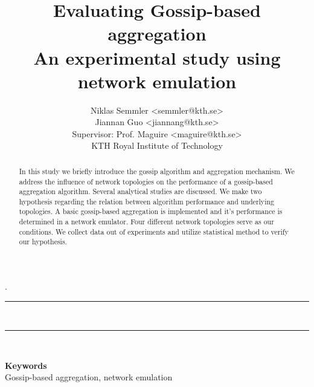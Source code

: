 \documentclass[11pt,a4paper]{article}
\date{}
\title{Evaluating Gossip-based aggregation\\{\large An experimental study using network emulation}}
\author{Niklas Semmler <semmler@kth.se>\\
Jiannan Guo <jiannang@kth.se>\\[0,25cm]
Supervisor: Prof. Maguire <maguire@kth.se>\\
KTH Royal Institute of Technology}%
\def\keywords#1{\begin{center}{\bf Keywords}\\{#1}\end{center}} %
\begin{document}
%
\maketitle
\newcommand{\HRule}{\rule{\linewidth}{0.5mm}}
{.} \\
\HRule \\
\begin{abstract}
In this study we briefly introduce the gossip algorithm and aggregation mechanism. We address the influence of network topologies on the performance of a gossip-based aggregation algorithm. Several analytical studies are discussed. We make two hypothesis regarding the relation between algorithm performance and underlying topologies. A basic gossip-based aggregation is implemented and it's performance is determined in a network emulator. Four different network topologies serve as our conditions. We collect data out of experiments and utilize statistical method to verify our hypothesis.
\end{abstract}
\HRule \\

\keywords{Gossip-based aggregation, network emulation}%










\newpage




\appendix
\end{document}

